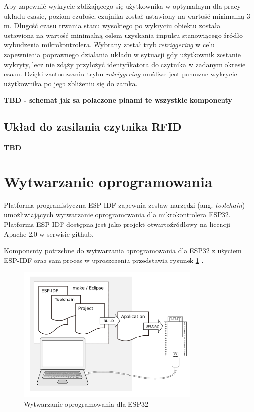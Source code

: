             Aby zapewnić wykrycie zbliżającego się użytkownika w optymalnym dla pracy układu czasie, poziom czułości czujnika został ustawiony na wartość minimalną 3 m. Długość czasu trwania stanu wysokiego po wykryciu obiektu została ustawiona na wartość minimalną celem uzyskania impulsu stanowiącego źródło wybudzenia mikrokontrolera. Wybrany został tryb \textit{retriggering} w celu zapewnienia poprawnego działania układu w sytuacji gdy użytkownik zostanie wykryty, lecz nie zdąży przyłożyć identyfikatora do czytnika w zadanym okresie czasu. Dzięki zastosowaniu trybu \textit{retriggering} możliwe jest ponowne wykrycie użytkownika po jego zbliżeniu się do zamka. 

            \textbf{TBD - schemat jak sa polaczone pinami te wszystkie komponenty}

        \subsection{Układ do zasilania czytnika RFID}

            \textbf{TBD}

    \section{Wytwarzanie oprogramowania}

        Platforma programistyczna ESP-IDF zapewnia zestaw narzędzi (ang. \textit{toolchain}) umożliwiających wytwarzanie oprogramowania dla mikrokontrolera ESP32. Platforma ESP-IDF dostępna jest jako projekt otwartoźródłowy na licencji Apache 2.0 w serwisie github.

        Komponenty potrzebne do wytwarzania oprogramowania dla ESP32 z użyciem ESP-IDF oraz sam proces w uproszczeniu przedstawia rysunek \ref{fig:esp32_dev} \cite{esp-idf-get-started}.

        \begin{figure}[]
            \centering
            \includegraphics[width=0.8\textwidth]{chapters/images/esp32_dev.png}
            \caption{Wytwarzanie oprogramowania dla ESP32}
            \label{fig:esp32_dev}
        \end{figure}

